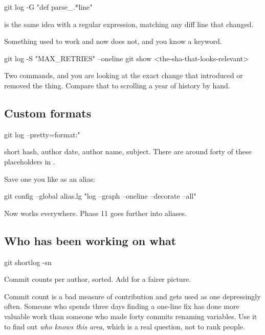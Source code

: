 \documentclass[11pt]{article}
\begin{document}
\begin{shell}
git log -G "def parse_.*line"
\end{shell}

 is the same idea with a regular expression, matching any diff line that
changed.

\begin{tryit}
Something used to work and now does not, and you know a keyword.

\begin{shell}
git log -S "MAX_RETRIES" --oneline
git show <the-sha-that-looks-relevant>
\end{shell}

Two commands, and you are looking at the exact change that introduced or removed the
thing. Compare that to scrolling a year of history by hand.
\end{tryit}

\subsection{Custom formats}

\begin{shell}
git log --pretty=format:"%
\end{shell}

 short hash,  author date,  author name,  subject.
There are around forty of these placeholders in .

Save one you like as an alias:

\begin{shell}
git config --global alias.lg "log --graph --oneline --decorate --all"
\end{shell}

Now  works everywhere. Phase 11 goes further into aliases.

\subsection{Who has been working on what}

\begin{shell}
git shortlog -sn
\end{shell}

Commit counts per author, sorted. Add  for a fairer picture.

\begin{note}
Commit count is a bad measure of contribution and gets used as one depressingly
often. Someone who spends three days finding a one-line fix has done more valuable
work than someone who made forty commits renaming variables. Use it to find out
\emph{who knows this area}, which is a real question, not to rank people.
\end{note}
\end{document}
